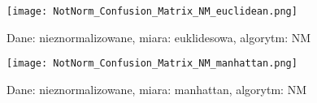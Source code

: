 	\begin{figure}[h!]
		\centering
		\texttt{[image: NotNorm\_Confusion\_Matrix\_NM\_euclidean.png]}
		\captionsetup{justification=centering}
		\caption{Dane: nieznormalizowane, miara: euklidesowa, algorytm: NM}
		\label{fig:20}
	\end{figure}
	
	\begin{figure}[h!]
		\centering
		\texttt{[image: NotNorm\_Confusion\_Matrix\_NM\_manhattan.png]}
		\captionsetup{justification=centering}
		\caption{Dane: nieznormalizowane, miara: manhattan, algorytm: NM}
		\label{fig:21}
	\end{figure}